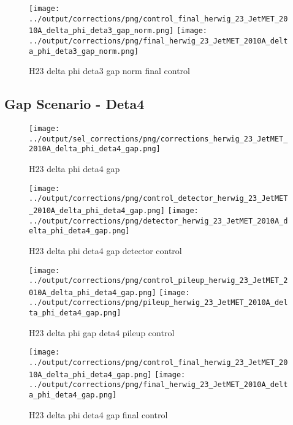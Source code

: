 \documentclass[11pt]{book}
\begin{document}
\begin{figure}[ht]
\centering
\texttt{[image: ../output/corrections/png/control\_final\_herwig\_23\_JetMET\_2010A\_delta\_phi\_deta3\_gap\_norm.png]}
\texttt{[image: ../output/corrections/png/final\_herwig\_23\_JetMET\_2010A\_delta\_phi\_deta3\_gap\_norm.png]}
\caption{H23 delta phi deta3 gap norm final control}
\label{fig:H23_JetMET_2010A_delta_phi_deta3_gap_norm_final_control}
\end{figure}


\clearpage
\subsection{Gap Scenario - Deta4}
\begin{figure}[ht]
\centering
\texttt{[image: ../output/sel\_corrections/png/corrections\_herwig\_23\_JetMET\_2010A\_delta\_phi\_deta4\_gap.png]}
\caption{H23 delta phi deta4 gap}
\label{fig:H23_JetMET_2010A_delta_phi_deta4_gap}
\end{figure}

\begin{figure}[ht]
\centering
\texttt{[image: ../output/corrections/png/control\_detector\_herwig\_23\_JetMET\_2010A\_delta\_phi\_deta4\_gap.png]}
\texttt{[image: ../output/corrections/png/detector\_herwig\_23\_JetMET\_2010A\_delta\_phi\_deta4\_gap.png]}
\caption{H23 delta phi deta4 gap detector control}
\label{fig:H23_JetMET_2010A_delta_phi_deta4_gap_detector_control}
\end{figure}

\begin{figure}[ht]
\centering
\texttt{[image: ../output/corrections/png/control\_pileup\_herwig\_23\_JetMET\_2010A\_delta\_phi\_deta4\_gap.png]}
\texttt{[image: ../output/corrections/png/pileup\_herwig\_23\_JetMET\_2010A\_delta\_phi\_deta4\_gap.png]}
\caption{H23 delta phi gap deta4 pileup control}
\label{fig:H23_JetMET_2010A_delta_phi_deta4_gap_pileup_control}
\end{figure}


\begin{figure}[ht]
\centering
\texttt{[image: ../output/corrections/png/control\_final\_herwig\_23\_JetMET\_2010A\_delta\_phi\_deta4\_gap.png]}
\texttt{[image: ../output/corrections/png/final\_herwig\_23\_JetMET\_2010A\_delta\_phi\_deta4\_gap.png]}
\caption{H23 delta phi deta4 gap final control}
\label{fig:H23_JetMET_2010A_delta_phi_deta4_gap_final_control}
\end{figure}
\end{document}
